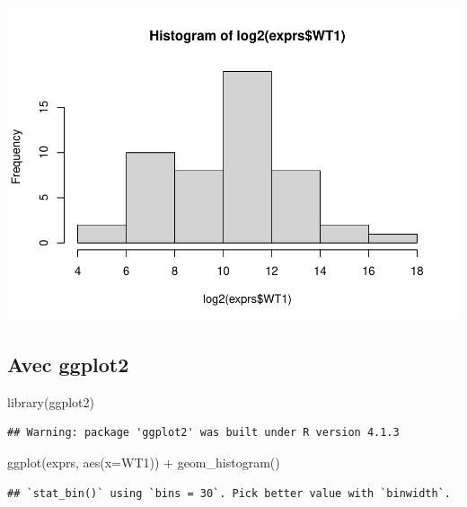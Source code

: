 \documentclass[
]{book}
\newenvironment{Shaded}{\begin{snugshade}}{\end{snugshade}}
\newcommand{\AttributeTok}[1]{\textcolor[rgb]{0.77,0.63,0.00}{#1}}
\newcommand{\FunctionTok}[1]{\textcolor[rgb]{0.00,0.00,0.00}{#1}}
\newcommand{\NormalTok}[1]{#1}
\newcommand{\SpecialCharTok}[1]{\textcolor[rgb]{0.00,0.00,0.00}{#1}}
\begin{document}
\begin{Shaded}
\end{Shaded}

\includegraphics{images/unnamed-chunk-75-1.pdf}

\hypertarget{avec-ggplot2}{%
\subsection{Avec ggplot2}\label{avec-ggplot2}}

\begin{Shaded}
\begin{Highlighting}[]
\FunctionTok{library}\NormalTok{(ggplot2)}
\end{Highlighting}
\end{Shaded}

\begin{verbatim}
## Warning: package 'ggplot2' was built under R version 4.1.3
\end{verbatim}

\begin{Shaded}
\begin{Highlighting}[]
\FunctionTok{ggplot}\NormalTok{(exprs, }\FunctionTok{aes}\NormalTok{(}\AttributeTok{x=}\NormalTok{WT1)) }\SpecialCharTok{+} \FunctionTok{geom\_histogram}\NormalTok{()}
\end{Highlighting}
\end{Shaded}

\begin{verbatim}
## `stat_bin()` using `bins = 30`. Pick better value with `binwidth`.
\end{verbatim}
\end{document}
